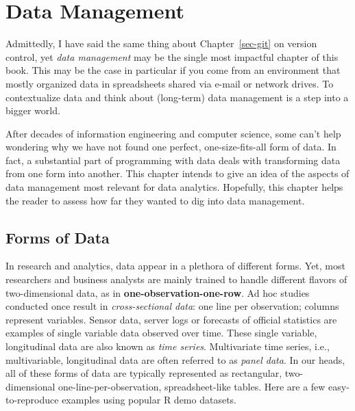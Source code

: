 \documentclass[
  12pt,
  letterpaper,
]{krantz}
\begin{document}

\hypertarget{sec-datamngmnt}{%
\chapter{Data Management}\label{sec-datamngmnt}}

\normalsize

\normalsize

Admittedly, I have said the same thing about Chapter~\ref{sec-git} on
version control, yet \emph{data management} may be the single most
impactful chapter of this book. This may be the case in particular if
you come from an environment that mostly organized data in spreadsheets
shared via e-mail or network drives. To contextualize data and think
about (long-term) data management is a step into a bigger world.

After decades of information engineering and computer science, some
can't help wondering why we have not found one perfect,
one-size-fits-all form of data. In fact, a substantial part of
programming with data deals with transforming data from one form into
another. This chapter intends to give an idea of the aspects of data
management most relevant for data analytics. Hopefully, this chapter
helps the reader to assess how far they wanted to dig into data
management.

\hypertarget{forms-of-data}{%
\section{Forms of Data}\label{forms-of-data}}

In research and analytics, data appear in a plethora of different forms.
Yet, most researchers and business analysts are mainly trained to handle
different flavors of two-dimensional data, as in
\textbf{one-observation-one-row}. Ad hoc studies conducted once result
in \emph{cross-sectional data}: one line per
observation; columns represent variables. Sensor data, server logs or
forecasts of official statistics are examples of single variable data
observed over time. These single variable, longitudinal data are also
known as \emph{time series}. Multivariate time
series, i.e., multivariable, longitudinal data are
often referred to as \emph{panel data}. In our heads, all of these forms
of data are typically represented as rectangular, two-dimensional
one-line-per-observation, spreadsheet-like tables. Here are a few
easy-to-reproduce examples using popular R demo datasets.
\end{document}
